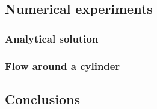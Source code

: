 \documentclass[compress,11 pt,t]{beamer}
\begin{document}
\subsection{Numerical experiments}

\subsubsection{Analytical solution}

\subsubsection{Flow around a cylinder}

\subsection{Conclusions}

\end{document}
